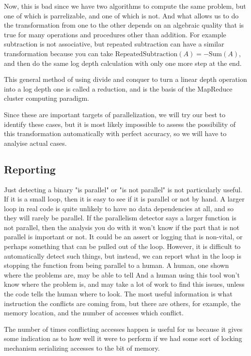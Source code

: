 \documentclass[12pt,twoside]{reedthesis}
\begin{document}
		Now, this is bad since we have two algorithms to compute the same problem, but one of which is parrelizable, and one of which is not. And what allows us to do the transformation from one to the other depends on an algebraic quality that is true for many operations and procedures other than addition. For example subtraction is not associative, but repeated subtraction can have a similar transformation because you can take $\text{RepeatedSubtraction}(A) = -\text{Sum}(A)$, and then do the same log depth calculation with only one more step at the end.

		This general method of using divide and conquer to turn a linear depth operation into a log depth one is called a reduction, and is the basis of the MapReduce cluster computing paradigm.

		Since these are important targets of parallelization, we will try our best to identify these cases, but it is most likely impossible to assess the possibility of this transformation automatically with perfect accuracy, so we will have to analyise actual cases.

		\subsection{Reporting}

		Just detecting a binary "is parallel" or "is not parallel" is not particularly useful. If it is a small loop, then it is easy to see if it is parallel or not by hand. A larger loop in real code is quite unlikely to have no data dependencies at all, and so they will rarely be parallel. If the parallelism detector says a larger function is not parallel, then the analysis you do with it won't know if the part that is not parallel is important or not. It could be an assert or logging that is non-vital, or perhaps something that can be pulled out of the loop. However, it is difficult to automatically detect such things, but instead, we can report what in the loop is stopping the function from being parallel to a human. A human, one shown where the problems are, may be able to tell  And a human using this tool won't know where the problem is, and may take a lot of work to find this issues, unless the code tells the human where to look. The most useful information is what instruction the conflicts are coming from, but there are others, for example, the memory location, and the number of accesses which conflict.

		The number of times conflicting accesses happen is useful for us because it gives some indication as to how well it were to perform if we had some sort of locking mechanism serializing accesses to the bit of memory.
\end{document}
